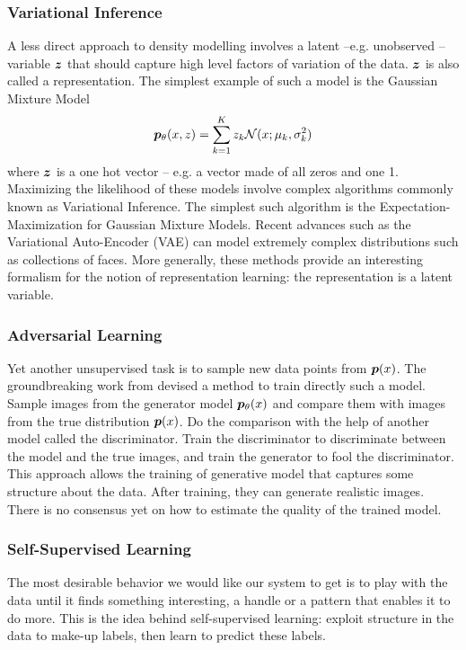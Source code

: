 \subsubsection{Variational Inference}
A less direct approach to density modelling involves a latent --e.g. unobserved -- variable ${\bm{z}}$ that should capture high level factors of variation of the data. ${\bm{z}}$ is also called a representation. The simplest example of such a model is the Gaussian Mixture Model
\begin{align}
    \bm{p}_{\theta}(x, z) = \sum_{k=1}^K z_k {\mathcal N}(x ; \mu_k, \sigma_k^2)
\end{align}
where ${\bm{z}}$ is a one hot vector -- e.g. a vector made of all zeros and one 1.
Maximizing the likelihood of these models involve complex algorithms commonly known as Variational Inference. The simplest such algorithm is the Expectation-Maximization for Gaussian Mixture Models. Recent advances such as the Variational Auto-Encoder (VAE) \citep{kingma2013auto} can model extremely complex distributions such as collections of faces. 
More generally, these methods provide an interesting formalism for the notion of representation learning: the representation is a latent variable. 

\subsubsection{Adversarial Learning}
Yet another  unsupervised task  is to sample new data points from $\bm{p}(x)$. The groundbreaking work from \citet{goodfellow2014generative} devised a method to train directly such a model. Sample images from the generator model $\bm{p}_{\theta}(x)$ and compare them with images from the true distribution  $\bm{p}(x)$. Do the comparison with the help of another model called the discriminator. Train the discriminator to discriminate between the model and the true images, and train the generator to fool the discriminator. This approach allows the training of generative model that captures some structure about the data. After training, they can generate realistic images. There is no consensus yet on how to estimate the quality of the trained model. 

\subsubsection{Self-Supervised Learning}
The most desirable behavior we would like our system to get is to play with the data until it finds something interesting, a handle or a pattern that enables it to do more. This is the idea behind self-supervised learning: exploit structure in the data to make-up labels, then learn to predict these labels. 


